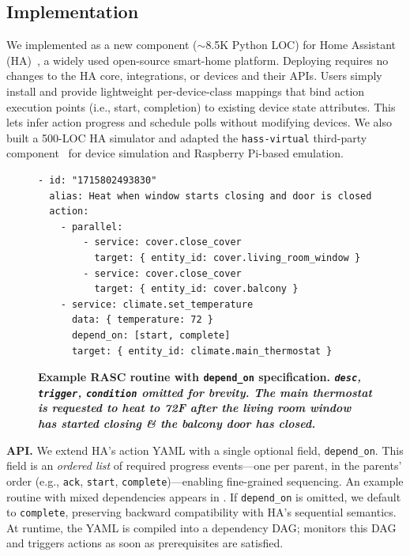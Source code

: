 \subsection{Implementation}
\label{rasc:sec:impl}

We implemented \sysname{} as a new component ($\sim$8.5K Python LOC) for Home Assistant (HA)~\cite{HAcore}, a widely used open-source smart-home platform. 
Deploying \sysname{} requires no changes to the HA core, integrations, or devices and their APIs. Users simply install \sysname{} and 
provide lightweight per-device-class mappings that bind action execution points (i.e., start, completion) to existing device state attributes. 
This lets \sysname{} infer action progress and schedule polls without modifying devices.
We also built a 500-LOC
HA simulator and adapted the \texttt{hass-virtual} third-party component~\cite{hassvirtual} for device simulation and Raspberry Pi-based emulation.

\begin{figure}[t]
\centering
\begin{minipage}{0.99\linewidth}
\begin{verbatim}
- id: "1715802493830"
  alias: Heat when window starts closing and door is closed
  action:
    - parallel:
        - service: cover.close_cover
          target: { entity_id: cover.living_room_window }
        - service: cover.close_cover
          target: { entity_id: cover.balcony }
    - service: climate.set_temperature
      data: { temperature: 72 }
      depend_on: [start, complete]
      target: { entity_id: climate.main_thermostat }
\end{verbatim}
\caption{\bf \small Example RASC routine with \texttt{depend\_on} specification. 
{\it \texttt{desc}, \texttt{trigger}, \texttt{condition} omitted for brevity. The main thermostat is requested to heat to 72\textdegree F after the living room window has started closing \& the balcony door has closed. 
}}
\label{rasc:lst:script-example}
\end{minipage}
\medskip
\end{figure}

\noindent \textbf{\abs{} API.}
We extend HA's action YAML with a single optional field, \texttt{depend\_on}. 
This field is an \emph{ordered list} of required progress events---one per parent, in the parents' order (e.g., \texttt{ack}, \texttt{start}, \texttt{complete})---enabling fine-grained sequencing.
An example routine with mixed dependencies appears in .
If \texttt{depend\_on} is omitted, we default to \texttt{complete}, preserving backward compatibility with HA's sequential semantics.
At runtime, the YAML is compiled into a dependency DAG; \scheduler{} monitors this DAG and triggers actions as soon as prerequisites are satisfied.

